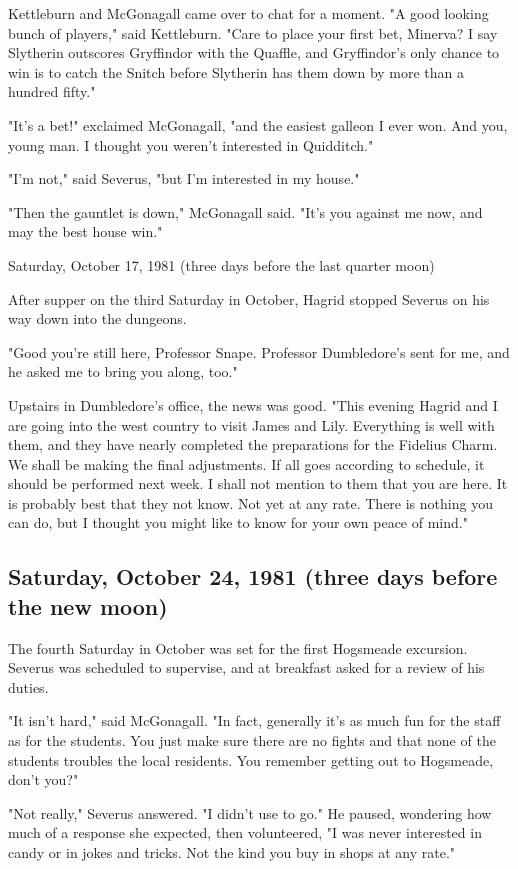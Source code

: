 Kettleburn and McGonagall came over to chat for a moment. "A good looking bunch of players," said Kettleburn. "Care to place your first bet, Minerva? I say Slytherin outscores Gryffindor with the Quaffle, and Gryffindor's only chance to win is to catch the Snitch before Slytherin has them down by more than a hundred fifty."

"It's a bet!" exclaimed McGonagall, "and the easiest galleon I ever won. And you, young man. I thought you weren't interested in Quidditch."

"I'm not," said Severus, "but I'm interested in my house."

"Then the gauntlet is down," McGonagall said. "It's you against me now, and may the best house win."

Saturday, October 17, 1981 (three days before the last quarter moon)

After supper on the third Saturday in October, Hagrid stopped Severus on his way down into the dungeons.

"Good you're still here, Professor Snape. Professor Dumbledore's sent for me, and he asked me to bring you along, too."

Upstairs in Dumbledore's office, the news was good. "This evening Hagrid and I are going into the west country to visit James and Lily. Everything is well with them, and they have nearly completed the preparations for the Fidelius Charm. We shall be making the final adjustments. If all goes according to schedule, it should be performed next week. I shall not mention to them that you are here. It is probably best that they not know. Not yet at any rate. There is nothing you can do, but I thought you might like to know for your own peace of mind."

\subsection{Saturday, October 24, 1981 (three days before the new moon)}

The fourth Saturday in October was set for the first Hogsmeade excursion. Severus was scheduled to supervise, and at breakfast asked for a review of his duties.

"It isn't hard," said McGonagall. "In fact, generally it's as much fun for the staff as for the students. You just make sure there are no fights and that none of the students troubles the local residents. You remember getting out to Hogsmeade, don't you?"

"Not really," Severus answered. "I didn't use to go." He paused, wondering how much of a response she expected, then volunteered, "I was never interested in candy or in jokes and tricks. Not the kind you buy in shops at any rate."

